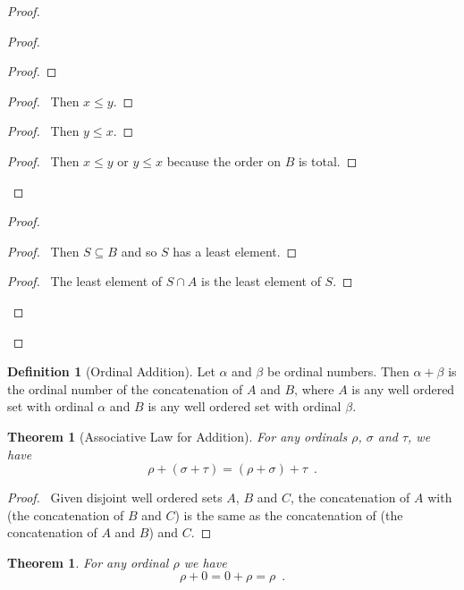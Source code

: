 \documentclass{book}
\let\qed\relax
\newtheorem{thm}[ax]{Theorem}
\theoremstyle{definition}
\newtheorem{df}[ax]{Definition}
\begin{document}
\begin{proof}
\begin{proof}
\begin{proof}
	\end{proof}
	\begin{proof}
		\pf\ Then $x \leq y$.
	\end{proof}
	\begin{proof}
		\pf\ Then $y \leq x$.
	\end{proof}
	\begin{proof}
		\pf\ Then $x \leq y$ or $y \leq x$ because the order on $B$ is total.
	\end{proof}
\end{proof}
\begin{proof}
	\begin{proof}
		\pf\ Then $S \subseteq B$ and so $S$ has a least element.
	\end{proof}
	\begin{proof}
		\pf\ The least element of $S \cap A$ is the least element of $S$.
	\end{proof}
\end{proof}
\qed
\end{proof}

\begin{df}[Ordinal Addition]
Let $\alpha$ and $\beta$ be ordinal numbers. Then $\alpha + \beta$ is the ordinal number of the concatenation of $A$ and $B$, where $A$ is any well ordered set with ordinal $\alpha$ and $B$ is any well ordered set with ordinal $\beta$.
\end{df}

\begin{thm}[Associative Law for Addition]
For any ordinals $\rho$, $\sigma$ and $\tau$, we have
\[ \rho + (\sigma + \tau) = (\rho + \sigma) + \tau \enspace . \]
\end{thm}

\begin{proof}
\pf\ Given disjoint well ordered sets $A$, $B$ and $C$, the concatenation of $A$ with (the concatenation of $B$ and $C$) is the same as the concatenation of (the concatenation of $A$ and $B$) and $C$. \qed
\end{proof}

\begin{thm}
For any ordinal $\rho$ we have
\[ \rho + 0 = 0 + \rho = \rho \enspace . \]
\end{thm}
\end{document}
